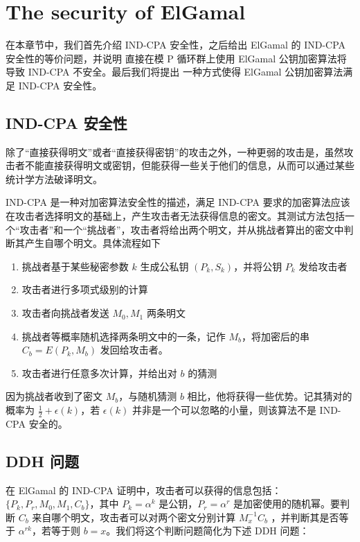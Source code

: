 \section{The security of ElGamal}

在本章节中，我们首先介绍 IND-CPA 安全性，之后给出 ElGamal 的 IND-CPA 安全性的等价问题，并说明
直接在模 P 循环群上使用 ElGamal 公钥加密算法将导致 IND-CPA 不安全。最后我们将提出
一种方式使得 ElGamal 公钥加密算法满足 IND-CPA 安全性。

\subsection{IND-CPA 安全性}

除了“直接获得明文”或者“直接获得密钥”的攻击之外，一种更弱的攻击是，虽然攻击者不能直接获得明文或密钥，但能获得一些关于他们的信息，从而可以通过某些统计学方法破译明文。

IND-CPA 是一种对加密算法安全性的描述，满足 IND-CPA 要求的加密算法应该在攻击者选择明文的基础上，产生攻击者无法获得信息的密文。其测试方法包括一个“攻击者”和一个“挑战者”，攻击者将给出两个明文，并从挑战者算出的密文中判断其产生自哪个明文。具体流程如下

\begin{enumerate}
	\item 挑战者基于某些秘密参数 $k$ 生成公私钥 $(P_k, S_k)$，并将公钥 $P_k$ 发给攻击者
	\item 攻击者进行多项式级别的计算
	\item 攻击者向挑战者发送 $M_0, M_1$ 两条明文
	\item 挑战者等概率随机选择两条明文中的一条，记作 $M_b$，将加密后的串 $C_b=E(P_k, M_b)$ 发回给攻击者。
	\item 攻击者进行任意多次计算，并给出对 $b$ 的猜测
\end{enumerate}

因为挑战者收到了密文 $M_b$，与随机猜测 $b$ 相比，他将获得一些优势。记其猜对的概率为 $\frac{1}{2} + \epsilon(k)$，若 $\epsilon(k)$ 并非是一个可以忽略的小量，则该算法不是 IND-CPA 安全的。

\subsection{DDH 问题}

在 ElGamal 的 IND-CPA 证明中，攻击者可以获得的信息包括： $\{P_k, P_r, M_0, M_1, C_b\}$，其中 $P_k = \alpha^k$ 是公钥，$P_r = \alpha^r$ 是加密使用的随机幂。要判断 $C_b$ 来自哪个明文，攻击者可以对两个密文分别计算 $M_x^{-1}C_b$ ，并判断其是否等于 $\alpha^{rk}$，若等于则 $b=x$。我们将这个判断问题简化为下述 DDH 问题：

